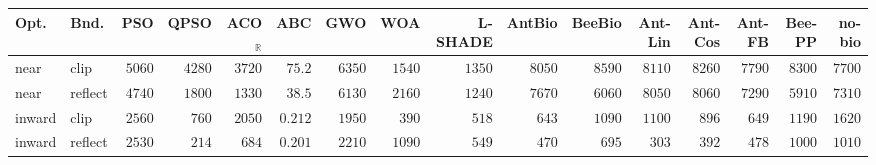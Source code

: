 \begin{tabular}{llrrrrrrrrrrrrrr}
\toprule
Opt. & Bnd. & PSO & QPSO & ACO$_\mathbb{R}$ & ABC & GWO & WOA & L-SHADE & AntBio & BeeBio & Ant-Lin & Ant-Cos & Ant-FB & Bee-PP & no-bio \\
\midrule
near & clip & $5060$ & $4280$ & $3720$ & $\mathbf{75.2}$ & $6350$ & $1540$ & $1350$ & $8050$ & $8590$ & $8110$ & $8260$ & $7790$ & $8300$ & $7700$ \\
near & reflect & $4740$ & $1800$ & $1330$ & $\mathbf{38.5}$ & $6130$ & $2160$ & $1240$ & $7670$ & $6060$ & $8050$ & $8060$ & $7290$ & $5910$ & $7310$ \\
inward & clip & $2560$ & $760$ & $2050$ & $\mathbf{0.212}$ & $1950$ & $390$ & $518$ & $643$ & $1090$ & $1100$ & $896$ & $649$ & $1190$ & $1620$ \\
inward & reflect & $2530$ & $214$ & $684$ & $\mathbf{0.201}$ & $2210$ & $1090$ & $549$ & $470$ & $695$ & $303$ & $392$ & $478$ & $1000$ & $1010$ \\
\bottomrule
\end{tabular}
